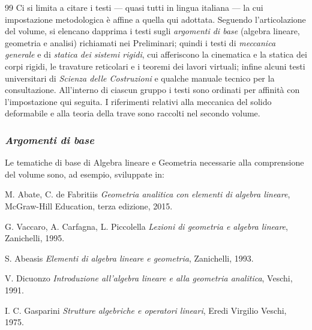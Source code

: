 \newpage

\begin{thebibliography}{99}
	\makeatletter
	\renewcommand{\@biblabel}[1]{}
	\makeatother
	\bibitem{}
	\noindent Ci si limita a citare i testi --- quasi tutti in lingua italiana ---
	la cui impostazione metodologica \`{e} affine a quella qui adottata. 
	Seguendo l'articolazione del volume, si elencano dapprima i
	testi sugli \emph{argomenti di base} (algebra lineare, geometria e
	analisi) richiamati nei Preliminari; quindi i testi di \emph{meccanica
		generale} e di \emph{statica dei sistemi rigidi}, cui afferiscono la
	cinematica e la statica dei corpi rigidi, le travature reticolari e i
	teoremi dei lavori virtuali; infine alcuni testi universitari di
	\emph{Scienza delle Costruzioni} e qualche manuale tecnico per la
	consultazione. All'interno di ciascun gruppo i testi sono ordinati per
	affinit\`{a} con l'impostazione qui seguita. I riferimenti relativi alla
	meccanica del solido deformabile e alla teoria della trave sono raccolti
	nel secondo volume.
	\newline
	
	\makeatletter
	\renewcommand{\@biblabel}[1]{[#1]}
	\setcounter{enumiv}{0} \makeatother
	
	
	\subsubsection{\emph{Argomenti di base}}
	\noindent Le tematiche di base di Algebra lineare e Geometria
	necessarie alla comprensione del volume sono, ad esempio, sviluppate in:
	
	M. Abate, C. de Fabritiis \emph{Geometria analitica con elementi di
		algebra lineare}, McGraw-Hill Education, terza edizione, 2015.
	
	G. Vaccaro, A. Carfagna, L. Piccolella {\em Lezioni di geometria e algebra lineare}, Zanichelli, 1995.
	
	S. Abeasis {\em Elementi di algebra lineare e geometria}, Zanichelli, 1993.
	
	V. Dicuonzo {\em Introduzione all'algebra lineare e alla geometria analitica}, Veschi, 1991.
	
	I. C. Gasparini {\em Strutture algebriche e operatori lineari}, Eredi Virgilio Veschi, 1975.
	

\end{thebibliography}

